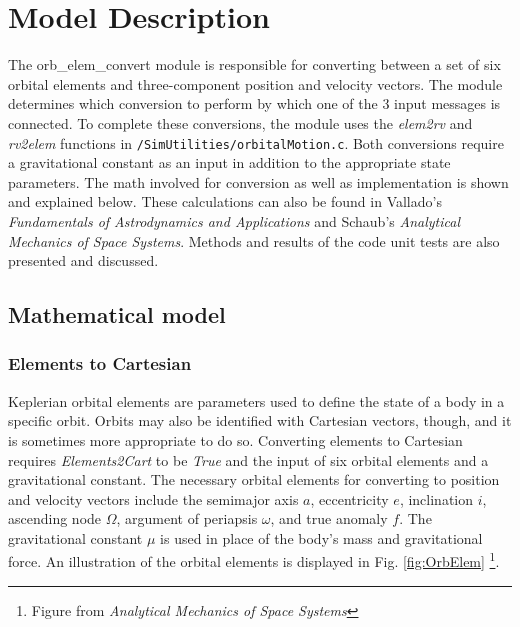 \section{Model Description}

The orb\_elem\_convert module is responsible for converting between a set of six orbital elements and three-component position and velocity vectors. The module determines which conversion to perform by which one of the 3 input messages is connected. To complete these conversions, the module uses the \textit{elem2rv} and \textit{rv2elem} functions in {\tt /SimUtilities/orbitalMotion.c}. Both conversions require a gravitational constant as an input in addition to the appropriate state parameters. The math involved for conversion as well as implementation is shown and explained below. These calculations can also be found in Vallado's \textit{Fundamentals of Astrodynamics and Applications}\cite{bib:1} and Schaub's \textit{Analytical Mechanics of Space Systems}\cite{bib:2}. Methods and results of the code unit tests are also presented and discussed.

\subsection{Mathematical model}

\subsubsection{Elements to Cartesian}

 Keplerian orbital elements are parameters used to define the state of a body in a specific orbit. Orbits may also be identified with Cartesian vectors, though, and it is sometimes more appropriate to do so. Converting elements to Cartesian requires \textit{Elements2Cart} to be \textit{True} and the input of six orbital elements and a gravitational constant. The necessary orbital elements for converting to position and velocity vectors include the semimajor axis $a$, eccentricity $e$, inclination $i$, ascending node $\Omega$, argument of periapsis $\omega$, and true anomaly $f$. The gravitational constant $\mu$ is used in place of the body's mass and gravitational force. An illustration of the orbital elements is displayed in Fig. \ref{fig:OrbElem} \footnote{Figure from \textit{Analytical Mechanics of Space Systems}}.

